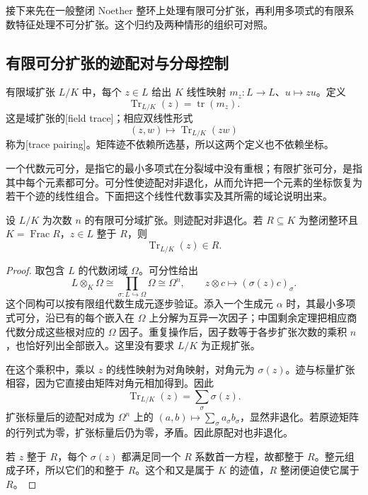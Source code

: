 接下来先在一般整闭 Noether 整环上处理有限可分扩张，再利用多项式的有限系数特征处理不可分扩张。这个归约及两种情形的组织可对照\cite[第33节，整闭包讨论及引理1，第262--263页]{Matsumura1989}。

\subsection{有限可分扩张的迹配对与分母控制}
\label{g5:subsec:0402:03}

有限域扩张 \(L/K\) 中，每个 \(z\in L\) 给出 \(K\) 线性映射 \(m_z:L\to L\)、\(u\mapsto zu\)。定义
\[
	\operatorname{Tr}_{L/K}(z)=\operatorname{tr}(m_z).
\]
这是域扩张的[field trace]；相应双线性形式
\[
	(z,w)\longmapsto\operatorname{Tr}_{L/K}(zw)
\]
称为[trace pairing]。矩阵迹不依赖所选基，所以这两个定义也不依赖坐标。

\ProseParagraphBreak

一个代数元可分，是指它的最小多项式在分裂域中没有重根；有限扩张可分，是指其中每个元素都可分。可分性使迹配对非退化，从而允许把一个元素的坐标恢复为若干个迹的线性组合。下面把这个线性代数事实及其所需的域论说明出来。

\begin{lemma}\label{g5:lem:separable-trace-pairing}
	设 \(L/K\) 为次数 \(n\) 的有限可分域扩张。则迹配对非退化。若 \(R\subseteq K\) 为整闭整环且 \(K=\operatorname{Frac}R\)，\(z\in L\) 整于 \(R\)，则
	\[
		\operatorname{Tr}_{L/K}(z)\in R.
	\]
\end{lemma}
\begin{proof}
	取包含 \(L\) 的代数闭域 \(\Omega\)。可分性给出
	\[
		L\otimes_K\Omega\cong\prod_{\sigma:L\hookrightarrow\Omega}\Omega
		\cong\Omega^n,\qquad z\otimes c\longmapsto(\sigma(z)c)_\sigma.
	\]
	这个同构可以按有限组代数生成元逐步验证。添入一个生成元 \(\alpha\) 时，其最小多项式可分，沿已有的每个嵌入在 \(\Omega\) 上分解为互异一次因子；中国剩余定理把相应商代数分成这些根对应的 \(\Omega\) 因子。重复操作后，因子数等于各步扩张次数的乘积 \(n\)，也恰好列出全部嵌入。这里没有要求 \(L/K\) 为正规扩张。

	在这个乘积中，乘以 \(z\) 的线性映射为对角映射，对角元为 \(\sigma(z)\)。迹与标量扩张相容，因为它直接由矩阵对角元相加得到。因此
	\[
		\operatorname{Tr}_{L/K}(z)=\sum_\sigma\sigma(z).
	\]
	扩张标量后的迹配对成为 \(\Omega^n\) 上的
	\((a,b)\mapsto\sum_\sigma a_\sigma b_\sigma\)，显然非退化。若原迹矩阵的行列式为零，扩张标量后仍为零，矛盾。因此原配对也非退化。

	若 \(z\) 整于 \(R\)，每个 \(\sigma(z)\) 都满足同一个 \(R\) 系数首一方程，故都整于 \(R\)。整元组成子环，所以它们的和整于 \(R\)。这个和又是属于 \(K\) 的迹值，\(R\) 整闭便迫使它属于 \(R\)。
\end{proof}

